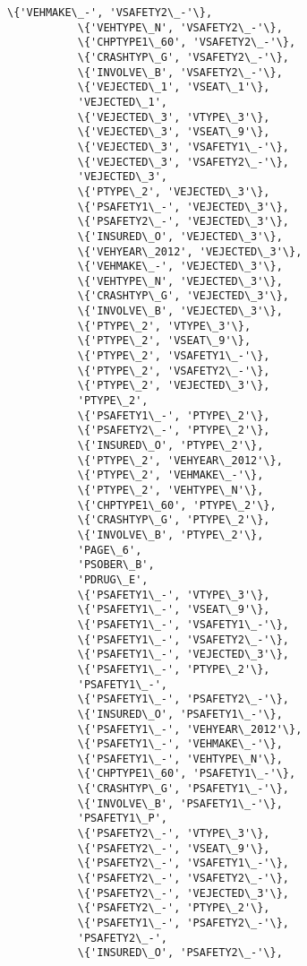 \documentclass[11pt]{article}
\begin{document}
\begin{Verbatim}[commandchars=\\\{\}]
           \{'VEHMAKE\_-', 'VSAFETY2\_-'\},
           \{'VEHTYPE\_N', 'VSAFETY2\_-'\},
           \{'CHPTYPE1\_60', 'VSAFETY2\_-'\},
           \{'CRASHTYP\_G', 'VSAFETY2\_-'\},
           \{'INVOLVE\_B', 'VSAFETY2\_-'\},
           \{'VEJECTED\_1', 'VSEAT\_1'\},
           'VEJECTED\_1',
           \{'VEJECTED\_3', 'VTYPE\_3'\},
           \{'VEJECTED\_3', 'VSEAT\_9'\},
           \{'VEJECTED\_3', 'VSAFETY1\_-'\},
           \{'VEJECTED\_3', 'VSAFETY2\_-'\},
           'VEJECTED\_3',
           \{'PTYPE\_2', 'VEJECTED\_3'\},
           \{'PSAFETY1\_-', 'VEJECTED\_3'\},
           \{'PSAFETY2\_-', 'VEJECTED\_3'\},
           \{'INSURED\_O', 'VEJECTED\_3'\},
           \{'VEHYEAR\_2012', 'VEJECTED\_3'\},
           \{'VEHMAKE\_-', 'VEJECTED\_3'\},
           \{'VEHTYPE\_N', 'VEJECTED\_3'\},
           \{'CRASHTYP\_G', 'VEJECTED\_3'\},
           \{'INVOLVE\_B', 'VEJECTED\_3'\},
           \{'PTYPE\_2', 'VTYPE\_3'\},
           \{'PTYPE\_2', 'VSEAT\_9'\},
           \{'PTYPE\_2', 'VSAFETY1\_-'\},
           \{'PTYPE\_2', 'VSAFETY2\_-'\},
           \{'PTYPE\_2', 'VEJECTED\_3'\},
           'PTYPE\_2',
           \{'PSAFETY1\_-', 'PTYPE\_2'\},
           \{'PSAFETY2\_-', 'PTYPE\_2'\},
           \{'INSURED\_O', 'PTYPE\_2'\},
           \{'PTYPE\_2', 'VEHYEAR\_2012'\},
           \{'PTYPE\_2', 'VEHMAKE\_-'\},
           \{'PTYPE\_2', 'VEHTYPE\_N'\},
           \{'CHPTYPE1\_60', 'PTYPE\_2'\},
           \{'CRASHTYP\_G', 'PTYPE\_2'\},
           \{'INVOLVE\_B', 'PTYPE\_2'\},
           'PAGE\_6',
           'PSOBER\_B',
           'PDRUG\_E',
           \{'PSAFETY1\_-', 'VTYPE\_3'\},
           \{'PSAFETY1\_-', 'VSEAT\_9'\},
           \{'PSAFETY1\_-', 'VSAFETY1\_-'\},
           \{'PSAFETY1\_-', 'VSAFETY2\_-'\},
           \{'PSAFETY1\_-', 'VEJECTED\_3'\},
           \{'PSAFETY1\_-', 'PTYPE\_2'\},
           'PSAFETY1\_-',
           \{'PSAFETY1\_-', 'PSAFETY2\_-'\},
           \{'INSURED\_O', 'PSAFETY1\_-'\},
           \{'PSAFETY1\_-', 'VEHYEAR\_2012'\},
           \{'PSAFETY1\_-', 'VEHMAKE\_-'\},
           \{'PSAFETY1\_-', 'VEHTYPE\_N'\},
           \{'CHPTYPE1\_60', 'PSAFETY1\_-'\},
           \{'CRASHTYP\_G', 'PSAFETY1\_-'\},
           \{'INVOLVE\_B', 'PSAFETY1\_-'\},
           'PSAFETY1\_P',
           \{'PSAFETY2\_-', 'VTYPE\_3'\},
           \{'PSAFETY2\_-', 'VSEAT\_9'\},
           \{'PSAFETY2\_-', 'VSAFETY1\_-'\},
           \{'PSAFETY2\_-', 'VSAFETY2\_-'\},
           \{'PSAFETY2\_-', 'VEJECTED\_3'\},
           \{'PSAFETY2\_-', 'PTYPE\_2'\},
           \{'PSAFETY1\_-', 'PSAFETY2\_-'\},
           'PSAFETY2\_-',
           \{'INSURED\_O', 'PSAFETY2\_-'\},

\end{Verbatim}
\end{document}
